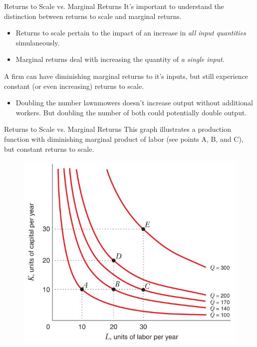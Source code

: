 \documentclass[11pt,t]{beamer}
\begin{document}
\begin{frame}{Returns to Scale vs. Marginal Returns}
  It's important to understand the distinction between returns to scale and marginal returns.
  
  \bigskip
  \begin{itemize}
    \item Returns to scale pertain to the impact of an increase in \textit{all input quantities} simulaneously.

    \item Marginal returns deal with increasing the quantity of \textit{a single input}.
  \end{itemize}

  \pause\bigskip
  A firm can have diminishing marginal returns to it's inputs, but still experience constant (or even increasing) returns to scale.
  
  \begin{itemize}
    \item Doubling the number lawnmowers doesn't increase output without additional workers. But doubling the number of both could potentially double output.
  \end{itemize}
\end{frame}

\begin{frame}{Returns to Scale vs. Marginal Returns}
  This graph illustrates a production function with diminishing marginal product of labor (see points A, B, and C), but constant returns to scale.

  \begin{figure}
    \includegraphics[width=0.6\linewidth]{figures/fig6_19.jpg}
  \end{figure}
\end{frame}
\end{document}
